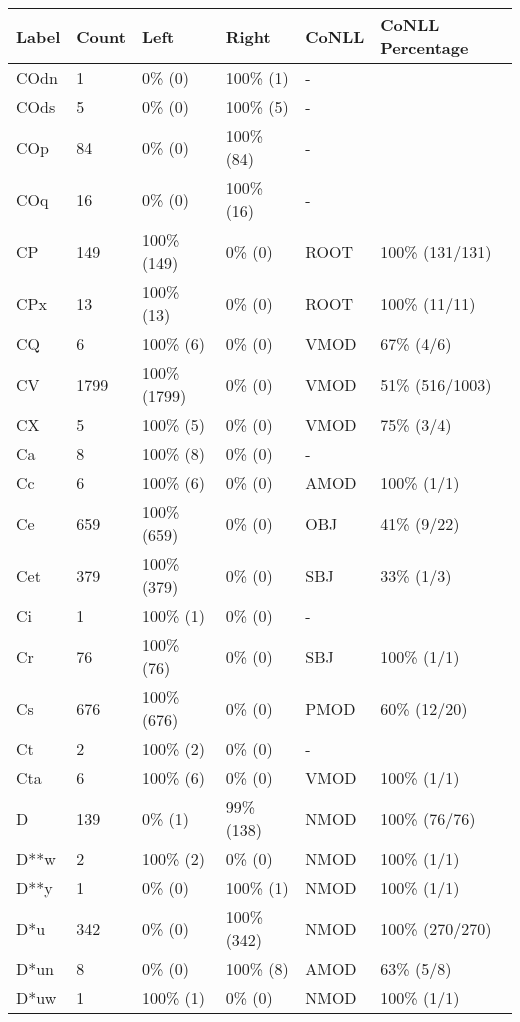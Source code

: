 \begin{figure*}
\begin{tabular}{|l|l|l|l||l|l|}
\hline
Label & Count & Left & Right & CoNLL & CoNLL Percentage\\ 
\hline
 COdn & 1 & 0\% (0) & 100\% (1) & - &  \\ 
\hline
 COds & 5 & 0\% (0) & 100\% (5) & - &  \\ 
\hline
 COp & 84 & 0\% (0) & 100\% (84) & - &  \\ 
\hline
 COq & 16 & 0\% (0) & 100\% (16) & - &  \\ 
\hline
 CP & 149 & 100\% (149) & 0\% (0) & ROOT & 100\% (131/131) \\ 
\hline
 CPx & 13 & 100\% (13) & 0\% (0) & ROOT & 100\% (11/11) \\ 
\hline
 CQ & 6 & 100\% (6) & 0\% (0) & VMOD & 67\% (4/6) \\ 
\hline
 CV & 1799 & 100\% (1799) & 0\% (0) & VMOD & 51\% (516/1003) \\ 
\hline
 CX & 5 & 100\% (5) & 0\% (0) & VMOD & 75\% (3/4) \\ 
\hline
 Ca & 8 & 100\% (8) & 0\% (0) & - &  \\ 
\hline
 Cc & 6 & 100\% (6) & 0\% (0) & AMOD & 100\% (1/1) \\ 
\hline
 Ce & 659 & 100\% (659) & 0\% (0) & OBJ & 41\% (9/22) \\ 
\hline
 Cet & 379 & 100\% (379) & 0\% (0) & SBJ & 33\% (1/3) \\ 
\hline
 Ci & 1 & 100\% (1) & 0\% (0) & - &  \\ 
\hline
 Cr & 76 & 100\% (76) & 0\% (0) & SBJ & 100\% (1/1) \\ 
\hline
 Cs & 676 & 100\% (676) & 0\% (0) & PMOD & 60\% (12/20) \\ 
\hline
 Ct & 2 & 100\% (2) & 0\% (0) & - &  \\ 
\hline
 Cta & 6 & 100\% (6) & 0\% (0) & VMOD & 100\% (1/1) \\ 
\hline
 D & 139 & 0\% (1) & 99\% (138) & NMOD & 100\% (76/76) \\ 
\hline
 D**w & 2 & 100\% (2) & 0\% (0) & NMOD & 100\% (1/1) \\ 
\hline
 D**y & 1 & 0\% (0) & 100\% (1) & NMOD & 100\% (1/1) \\ 
\hline
 D*u & 342 & 0\% (0) & 100\% (342) & NMOD & 100\% (270/270) \\ 
\hline
 D*un & 8 & 0\% (0) & 100\% (8) & AMOD & 63\% (5/8) \\ 
\hline
 D*uw & 1 & 100\% (1) & 0\% (0) & NMOD & 100\% (1/1) \\ 

\end{tabular}
\end{figure*}
